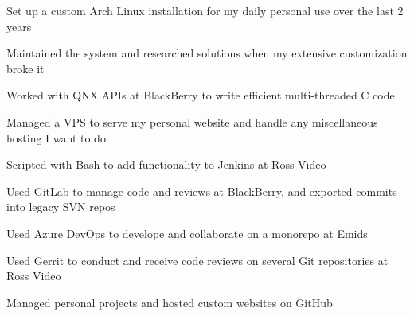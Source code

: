\begin{bullets}
    \item Set up a custom Arch Linux installation for my daily personal use over the last 2 years
    \item Maintained the system and researched solutions when my extensive customization broke it
    \item Worked with QNX APIs at BlackBerry to write efficient multi-threaded C code
    \item Managed a VPS to serve my personal website and handle any miscellaneous hosting I want to do
    \item Scripted with Bash to add functionality to Jenkins at Ross Video
\end{bullets}

\begin{bullets}
	\item Used GitLab to manage code and reviews at BlackBerry, and exported commits into legacy SVN repos
    \item Used Azure DevOps to develope and collaborate on a monorepo at Emids
    \item Used Gerrit to conduct and receive code reviews on several Git repositories at Ross Video
    \item Managed personal projects and hosted custom websites on GitHub
\end{bullets}
